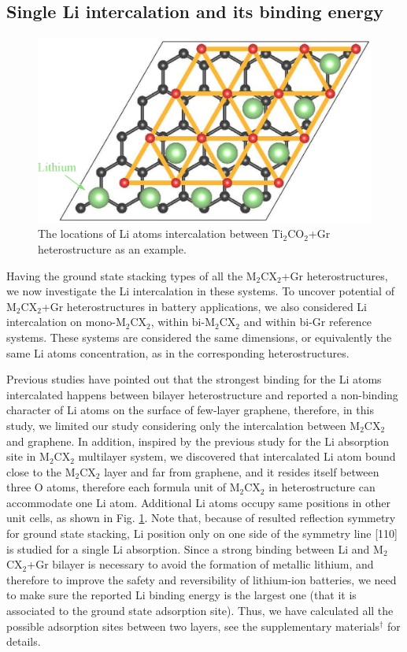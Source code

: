 \subsection{Single Li intercalation and its binding energy}

\begin{figure}[htb]
\centering
\includegraphics[width=0.8\linewidth]{sites.eps}%
\caption{The locations of Li atoms intercalation between Ti$_2$CO$_2$+Gr heterostructure as an example.  \label{sites}}
\end{figure}

Having the ground state stacking types of all the M$_2$CX$_2$+Gr heterostructures, we now investigate the Li intercalation in these systems. To uncover potential of M$_2$CX$_2$+Gr heterostructures in battery applications, we also considered Li intercalation on mono-M$_2$CX$_2$, within bi-M$_2$CX$_2$ and within bi-Gr reference systems. These systems are considered the same dimensions, or equivalently the same Li atoms concentration, as in the corresponding heterostructures.

Previous studies\cite{Guo2015,Samad2016,Lee2012} have pointed out that the strongest binding for the Li atoms intercalated happens between bilayer heterostructure and reported a non-binding character of Li atoms on the surface of few-layer graphene, therefore, in this study, we limited our study considering only the intercalation between M$_2$CX$_2$ and graphene. In addition, inspired by the previous study\cite{doi:10.1063/1.4939745} for the Li absorption site in M$_2$CX$_2$ multilayer system, we discovered that intercalated Li atom bound close to the M$_2$CX$_2$ layer and far from graphene, and it resides itself between three O atoms, therefore each formula unit of M$_2$CX$_2$ in heterostructure can accommodate one Li atom. Additional Li atoms occupy same positions in other unit cells, as shown in Fig. \ref{sites}. Note that, because of resulted reflection symmetry for ground state stacking, Li position only on one side of the symmetry line [110] is studied for a single Li absorption.  Since a strong binding between Li and M$_2$CX$_2$+Gr bilayer is necessary to avoid the formation of metallic lithium, and therefore to improve the safety and reversibility of lithium-ion batteries, we need to make sure the reported Li binding energy is the largest one (that it is associated to the ground state adsorption site). Thus, we have calculated all the possible adsorption sites between two layers, see the supplementary materials$^\dag$ for details. 


